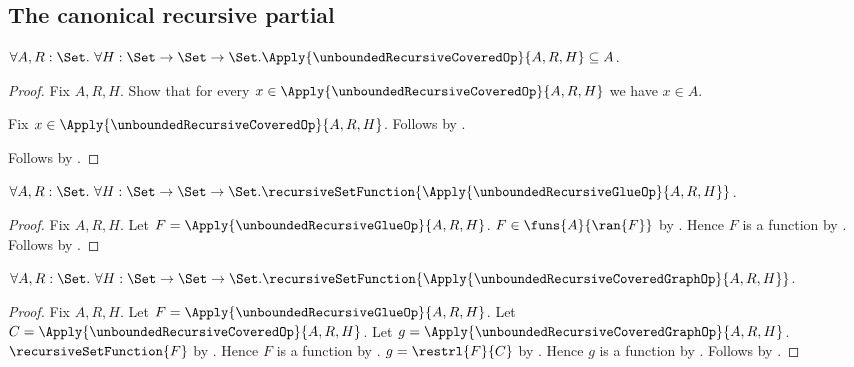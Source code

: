 \subsection{The canonical recursive partial}

\begin{proposition}\label{unbounded_recursive_covered_subseteq}
    $\forall A,R:\Set.\ \forall H:\Set\to\Set\to\Set.
        \Apply{\unboundedRecursiveCoveredOp}
            {A,R,H}
        \subseteq A$.
\end{proposition}
\begin{proof}
    Fix $A,R,H$.
    Show that for every
        $x\in\Apply{\unboundedRecursiveCoveredOp}
            {A,R,H}$
        we have $x\in A$.
    \begin{subproof}
        Fix
            $x\in\Apply{\unboundedRecursiveCoveredOp}
                {A,R,H}$.
        Follows by .
    \end{subproof}
    Follows by .
\end{proof}

\begin{proposition}\label{unbounded_recursive_glue_function}
    $\forall A,R:\Set.\ \forall H:\Set\to\Set\to\Set.
        \recursiveSetFunction{
            \Apply{\unboundedRecursiveGlueOp}
                {A,R,H}}$.
\end{proposition}
\begin{proof}
    Fix $A,R,H$.
    Let $F=\Apply{\unboundedRecursiveGlueOp}
        {A,R,H}$.
    $F\in\funs{A}{\ran{F}}$ by
        .
    Hence $F$ is a function by .
    Follows by .
\end{proof}

\begin{proposition}\label{unbounded_recursive_covered_graph_function}
    $\forall A,R:\Set.\ \forall H:\Set\to\Set\to\Set.
        \recursiveSetFunction{
            \Apply{\unboundedRecursiveCoveredGraphOp}
                {A,R,H}}$.
\end{proposition}
\begin{proof}
    Fix $A,R,H$.
    Let $F=\Apply{\unboundedRecursiveGlueOp}
        {A,R,H}$.
    Let $C=\Apply{\unboundedRecursiveCoveredOp}
        {A,R,H}$.
    Let $g=\Apply{\unboundedRecursiveCoveredGraphOp}
        {A,R,H}$.
    $\recursiveSetFunction{F}$ by
        .
    Hence $F$ is a function by .
    $g=\restrl{F}{C}$ by
        .
    Hence $g$ is a function by .
    Follows by .
\end{proof}

